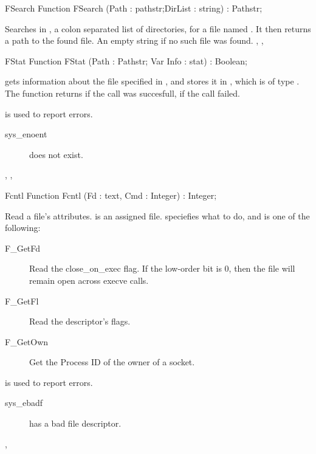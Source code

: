\html{}
\begin{function}{FSearch}
\Declaration
Function FSearch (Path : pathstr;DirList : string) : Pathstr;

\Description
 Searches in , a colon separated list of directories,
for a file named . It then returns a path to the found file.
\Errors
An empty string if no such file was found.
\SeeAlso
{}, ,  
\end{function}
\html{}
\begin{function}{FStat}
\Declaration
Function FStat (Path : Pathstr; Var Info : stat) : Boolean;

\Description

 gets information about the file specified in , and stores it in 
, which is of type .
The function returns  if the call was succesfull,  if the call
failed.

\Errors
  is used to report errors.
\begin{description}
\item[sys\_enoent]  does not exist.
\end{description}

\SeeAlso
{}, , 
\end{function}
\html{}
\begin{function}{Fcntl}
\Declaration
Function Fcntl (Fd :  text, Cmd : Integer) : Integer;

\Description

Read a file's attributes.  is an assigned file.
 speciefies what to do, and is one of the following:
\begin{description}
\item[F\_GetFd] Read the close\_on\_exec flag. If the low-order bit is 0, then
the file will remain open across execve calls.
\item[F\_GetFl] Read the descriptor's flags.
\item[F\_GetOwn] Get the Process ID of the owner of a socket.
\end{description}

\Errors

 is used to report errors.
\begin{description}
\item[sys\_ebadf]  has a bad file descriptor.
\end{description}

\SeeAlso
{},  
\end{function}
